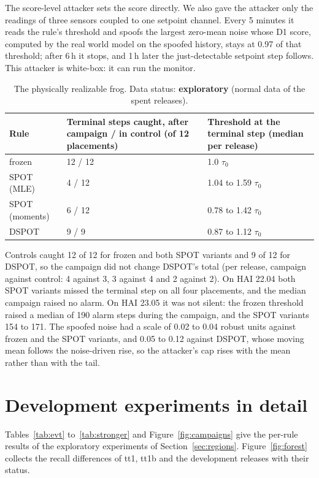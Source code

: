 \documentclass[sigconf,review,anonymous]{acmart}
\begin{document}
The score-level attacker sets the score directly. We also gave the attacker only the readings of
three sensors coupled to one setpoint channel. Every 5 minutes it reads the rule's threshold and
spoofs the largest zero-mean noise whose D1 score, computed by the real world model on the spoofed
history, stays at 0.97 of that threshold; after 6\,h it stops, and 1\,h later the just-detectable
setpoint step follows. This attacker is white-box: it can run the monitor.

\begin{table}[t]
\caption{The physically realizable frog. Data status: \textbf{exploratory} (normal data of the spent
releases).}
\label{tab:physfrog}
\small
\begin{tabular}{@{}p{}p{}p{}@{}}
\toprule
Rule & Terminal steps caught, after campaign / in control (of 12 placements) & Threshold at the terminal step (median per release) \\
\midrule
frozen & 12 / 12 & 1.0 $\tau_0$ \\
SPOT (MLE) & 4 / 12 & 1.04 to 1.59 $\tau_0$ \\
SPOT (moments) & 6 / 12 & 0.78 to 1.42 $\tau_0$ \\
DSPOT & 9 / 9 & 0.87 to 1.12 $\tau_0$ \\
\bottomrule
\end{tabular}
\end{table}

Controls caught 12 of 12 for frozen and both SPOT variants and 9 of 12 for DSPOT, so the campaign did not change DSPOT's total (per release, campaign against control: 4 against 3, 3 against 4 and 2 against 2). On HAI 22.04 both SPOT variants missed the terminal step on all four placements, and the median campaign raised no alarm. On HAI 23.05 it was not silent: the frozen threshold raised a median of
190 alarm steps during the campaign, and the SPOT variants 154 to 171. The
spoofed noise had a scale of 0.02 to 0.04 robust units against frozen and the SPOT variants, and 0.05
to 0.12 against DSPOT, whose moving mean follows the noise-driven rise, so the attacker's cap rises
with the mean rather than with the tail.

\section{Development experiments in detail}
\label{app:dev}

Tables~\ref{tab:evt} to~\ref{tab:stronger} and Figure~\ref{fig:campaigns} give the per-rule results of
the exploratory experiments of Section~\ref{sec:regions}. Figure~\ref{fig:forest} collects the recall differences of tt1, tt1b and
the development releases with their status.
\end{document}
